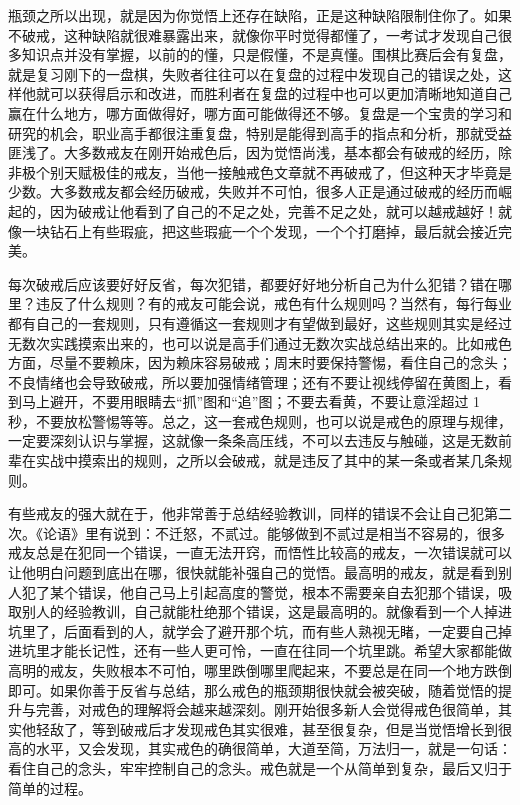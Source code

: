 瓶颈之所以出现，就是因为你觉悟上还存在缺陷，正是这种缺陷限制住你了。如果不破戒，这种缺陷就很难暴露出来，就像你平时觉得都懂了，一考试才发现自己很多知识点并没有掌握，以前的的懂，只是假懂，不是真懂。围棋比赛后会有复盘，就是复习刚下的一盘棋，失败者往往可以在复盘的过程中发现自己的错误之处，这样他就可以获得启示和改进，而胜利者在复盘的过程中也可以更加清晰地知道自己赢在什么地方，哪方面做得好，哪方面可能做得还不够。复盘是一个宝贵的学习和研究的机会，职业高手都很注重复盘，特别是能得到高手的指点和分析，那就受益匪浅了。大多数戒友在刚开始戒色后，因为觉悟尚浅，基本都会有破戒的经历，除非极个别天赋极佳的戒友，当他一接触戒色文章就不再破戒了，但这种天才毕竟是少数。大多数戒友都会经历破戒，失败并不可怕，很多人正是通过破戒的经历而崛起的，因为破戒让他看到了自己的不足之处，完善不足之处，就可以越戒越好！就像一块钻石上有些瑕疵，把这些瑕疵一个个发现，一个个打磨掉，最后就会接近完美。

每次破戒后应该要好好反省，每次犯错，都要好好地分析自己为什么犯错？错在哪里？违反了什么规则？有的戒友可能会说，戒色有什么规则吗？当然有，每行每业都有自己的一套规则，只有遵循这一套规则才有望做到最好，这些规则其实是经过无数次实践摸索出来的，也可以说是高手们通过无数次实战总结出来的。比如戒色方面，尽量不要赖床，因为赖床容易破戒；周末时要保持警惕，看住自己的念头；不良情绪也会导致破戒，所以要加强情绪管理；还有不要让视线停留在黄图上，看到马上避开，不要用眼睛去“抓”图和“追”图；不要去看黄，不要让意淫超过 1 秒，不要放松警惕等等。总之，这一套戒色规则，也可以说是戒色的原理与规律，一定要深刻认识与掌握，这就像一条条高压线，不可以去违反与触碰，这是无数前辈在实战中摸索出的规则，之所以会破戒，就是违反了其中的某一条或者某几条规则。

有些戒友的强大就在于，他非常善于总结经验教训，同样的错误不会让自己犯第二次。《论语》里有说到：不迁怒，不贰过。能够做到不贰过是相当不容易的，很多戒友总是在犯同一个错误，一直无法开窍，而悟性比较高的戒友，一次错误就可以让他明白问题到底出在哪，很快就能补强自己的觉悟。最高明的戒友，就是看到别人犯了某个错误，他自己马上引起高度的警觉，根本不需要亲自去犯那个错误，吸取别人的经验教训，自己就能杜绝那个错误，这是最高明的。就像看到一个人掉进坑里了，后面看到的人，就学会了避开那个坑，而有些人熟视无睹，一定要自己掉进坑里才能长记性，还有一些人更可怜，一直在往同一个坑里跳。希望大家都能做高明的戒友，失败根本不可怕，哪里跌倒哪里爬起来，不要总是在同一个地方跌倒即可。如果你善于反省与总结，那么戒色的瓶颈期很快就会被突破，随着觉悟的提升与完善，对戒色的理解将会越来越深刻。刚开始很多新人会觉得戒色很简单，其实他轻敌了，等到破戒后才发现戒色其实很难，甚至很复杂，但是当觉悟增长到很高的水平，又会发现，其实戒色的确很简单，大道至简，万法归一，就是一句话：看住自己的念头，牢牢控制自己的念头。戒色就是一个从简单到复杂，最后又归于简单的过程。

